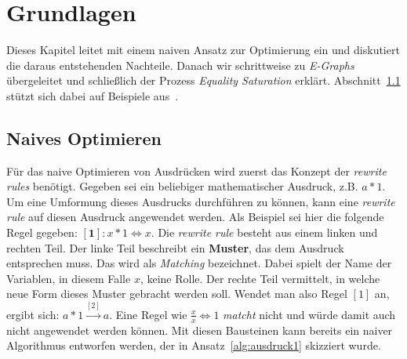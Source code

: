 \section{Grundlagen}\label{sec:grundlagen}


Dieses Kapitel leitet mit einem naiven Ansatz zur Optimierung ein und diskutiert die daraus entstehenden Nachteile.
Danach wir schrittweise zu \textit{E-Graphs}
übergeleitet und schließlich der Prozess \textit{Equality Saturation} erklärt.
Abschnitt~\ref{subsec:naiv} stützt sich dabei auf Beispiele aus~\cite{cole}.

\subsection{Naives Optimieren}\label{subsec:naiv}

Für das naive Optimieren von Ausdrücken wird zuerst das Konzept der \textit{rewrite rules} benötigt. Gegeben sei ein beliebiger mathematischer Ausdruck, z.B.
$a * 1$. Um eine Umformung dieses Ausdrucks durchführen zu können, kann eine \textit{rewrite rule} auf diesen Ausdruck angewendet werden.
Als Beispiel sei hier die folgende Regel gegeben: $[\mathbf{1}]: x * 1 \Leftrightarrow x$. Die \textit{rewrite rule} besteht aus einem linken und rechten Teil. Der linke Teil
beschreibt ein \textbf{Muster}, das dem Ausdruck entsprechen muss. Das wird als \textit{Matching} bezeichnet. Dabei spielt der Name der Variablen, in diesem Falle $x$, keine Rolle.
Der rechte Teil vermittelt, in welche neue Form dieses Muster gebracht werden soll. Wendet man also Regel $[1]$ an,
ergibt sich: $a * 1  \overset{[2]}{\rightarrow} a$. 
Eine Regel wie $\frac{x}{x} \Leftrightarrow 1$ \textit{matcht} nicht und würde damit auch nicht angewendet werden können.
Mit diesen Bausteinen kann bereits ein naiver Algorithmus entworfen werden, der in Ansatz~\ref{alg:ausdruck1} skizziert wurde. 


